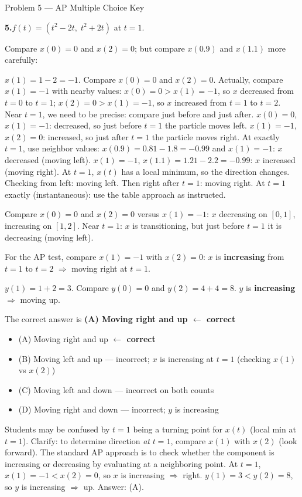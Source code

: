 \documentclass[10pt]{article}
\begin{document}
\begin{notesbox}{Problem 5 --- AP Multiple Choice Key}

\textbf{5.}\quad $f(t) = (t^2 - 2t,\; t^2 + 2t)$ at $t = 1$.

Compare $x(0) = 0$ and $x(2) = 0$; but compare $x(0.9)$ and $x(1.1)$ more carefully:

$x(1) = 1 - 2 = -1$. Compare $x(0) = 0$ and $x(2) = 0$.
Actually, compare $x(1)=-1$ with nearby values:
$x(0) = 0 > x(1) = -1$, so $x$ decreased from $t=0$ to $t=1$;
$x(2) = 0 > x(1) = -1$, so $x$ increased from $t=1$ to $t=2$.
Near $t = 1$, we need to be precise: compare just before and just after.
$x(0) = 0$, $x(1) = -1$: decreased, so just before $t=1$ the particle moves left.
$x(1) = -1$, $x(2) = 0$: increased, so just after $t=1$ the particle moves right.
At exactly $t=1$, use neighbor values: $x(0.9) = 0.81 - 1.8 = -0.99$ and
$x(1) = -1$: $x$ decreased (moving left). $x(1) = -1$, $x(1.1) = 1.21 - 2.2 = -0.99$: $x$ increased (moving right).
At $t = 1$, $x(t)$ has a local minimum, so the direction changes. Checking from left: moving left. Then right after $t=1$: moving right.
At $t=1$ exactly (instantaneous): use the table approach as instructed.

Compare $x(0) = 0$ and $x(2) = 0$ versus $x(1) = -1$: $x$ decreasing on $[0,1]$, increasing on $[1,2]$.
Near $t = 1$: $x$ is transitioning, but just before $t = 1$ it is decreasing (moving left).

For the AP test, compare $x(1)=-1$ with $x(2)=0$: $x$ is \textbf{increasing} from $t=1$ to $t=2$ $\Rightarrow$ moving right at $t=1$.

$y(1) = 1 + 2 = 3$. Compare $y(0) = 0$ and $y(2) = 4 + 4 = 8$. $y$ is \textbf{increasing} $\Rightarrow$ moving up.

The correct answer is \textcolor{keyred}{\textbf{(A) Moving right and up $\leftarrow$ correct}}

\begin{itemize}[leftmargin=1.4em, itemsep=2pt]
  \item (A) Moving right and up \textcolor{keyred}{\textbf{$\leftarrow$ correct}}
  \item (B) Moving left and up --- incorrect; $x$ is increasing at $t=1$ (checking $x(1)$ vs $x(2)$)
  \item (C) Moving left and down --- incorrect on both counts
  \item (D) Moving right and down --- incorrect; $y$ is increasing
\end{itemize}

\begin{teachernote}
  Students may be confused by $t = 1$ being a turning point for $x(t)$ (local min at $t=1$).
  Clarify: to determine direction \emph{at} $t = 1$, compare $x(1)$ with $x(2)$ (look forward).
  The standard AP approach is to check whether the component is increasing or decreasing by
  evaluating at a neighboring point. At $t=1$, $x(1) = -1 < x(2) = 0$, so $x$ is increasing
  $\Rightarrow$ right. $y(1) = 3 < y(2) = 8$, so $y$ is increasing $\Rightarrow$ up. Answer: (A).
\end{teachernote}

\end{notesbox}
\end{document}
